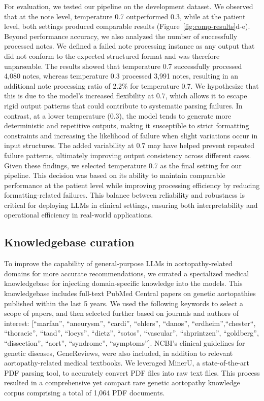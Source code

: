 \documentclass[fleqn,10pt]{wlscirep}
\begin{document}
For evaluation, we tested our pipeline on the development dataset. We observed that at the note level, temperature 0.7 outperformed 0.3, while at the patient level, both settings produced comparable results (Figure~\ref{fig:comp-results}d-e). Beyond performance accuracy, we also analyzed the number of successfully processed notes. We defined a failed note processing instance as any output that did not conform to the expected structured format and was therefore unparseable. The results showed that temperature 0.7 successfully processed 4,080 notes, whereas temperature 0.3 processed 3,991 notes, resulting in an additional note processing ratio of 2.2\% for temperature 0.7. We hypothesize that this is due to the model's increased flexibility at 0.7, which allows it to escape rigid output patterns that could contribute to systematic parsing failures. In contrast, at a lower temperature (0.3), the model tends to generate more deterministic and repetitive outputs, making it susceptible to strict formatting constraints and increasing the likelihood of failure when slight variations occur in input structures. The added variability at 0.7 may have helped prevent repeated failure patterns, ultimately improving output consistency across different cases. Given these findings, we selected temperature 0.7 as the final setting for our pipeline. This decision was based on its ability to maintain comparable performance at the patient level while improving processing efficiency by reducing formatting-related failures. This balance between reliability and robustness is critical for deploying LLMs in clinical settings, ensuring both interpretability and operational efficiency in real-world applications.


\subsection*{Knowledgebase curation}
To improve the capability of general-purpose LLMs in aortopathy-related domains for more accurate recommendations, we curated a specialized medical knowledgebase for injecting domain-specific knowledge into the models. This knowledgebase includes full-text PubMed Central papers on genetic aortopathies published within the last 5 years. We used the following keywords to select a scope of papers, and then selected further based on journals and authors of interest: [``marfan'', ``aneurysm'', ``cardi'', ``ehlers'', ``danos'', ``erdheim'',``chester``, ``thoracic'', ``taad'', ``loeys'', ``dietz'', ``sotos'', ``vascular'', ``shprintzen'', ``goldberg'', ``dissection'', ``aort'', ``syndrome'', ``symptoms''].  NCBI’s clinical guidelines for genetic diseases, GeneReviews, were also included, in addition to relevant aortopathy-related medical textbooks. We leveraged MinerU,\cite{wang2024mineru} a state-of-the-art PDF parsing tool, to accurately convert PDF files into raw text files. This process resulted in a comprehensive yet compact rare genetic aortopathy knowledge corpus comprising a total of 1,064 PDF documents.
\end{document}
